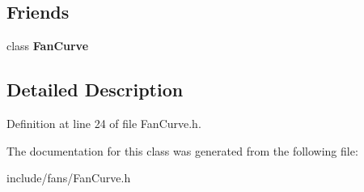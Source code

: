 \subsection*{Friends}
\begin{DoxyCompactItemize}
\item 
\mbox{\label{class_fan_curve_data_a5fd2f838324ef64e240da0dbd78e25b5}} 
class {\bfseries Fan\+Curve}
\end{DoxyCompactItemize}


\subsection{Detailed Description}


Definition at line 24 of file Fan\+Curve.\+h.



The documentation for this class was generated from the following file\+:\begin{DoxyCompactItemize}
\item 
include/fans/Fan\+Curve.\+h\end{DoxyCompactItemize}
